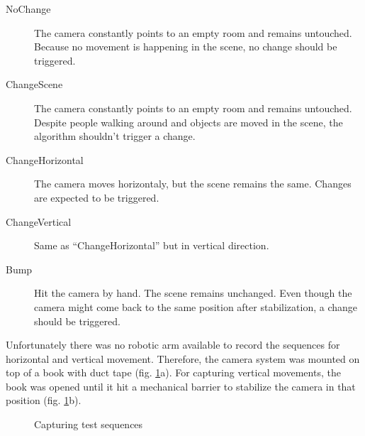 \begin{description}
	\item[NoChange] The camera constantly points to an empty room and remains untouched. Because no movement is happening in the scene, no change should be triggered.
	\item[ChangeScene] The camera constantly points to an empty room and remains untouched. Despite people walking around and objects are moved in the scene, the algorithm shouldn't trigger a change.
	\item[ChangeHorizontal] The camera moves horizontaly, but the scene remains the same. Changes are expected to be triggered.
	\item[ChangeVertical] Same as \enquote{ChangeHorizontal} but in vertical direction.
	\item[Bump] Hit the camera by hand. The scene remains unchanged. Even though the camera might come back to the same position after stabilization, a change should be triggered.
\end{description}

Unfortunately there was no robotic arm available to record the sequences for horizontal and vertical movement. Therefore, the camera system was mounted on top of a book with duct tape (fig. \ref{fig:capture}a). For capturing vertical movements, the book was opened until it hit a mechanical barrier to stabilize the camera in that position (fig. \ref{fig:capture}b).\newline

\begin{figure} [h]
	\caption{Capturing test sequences} 
	\label{fig:capture}
\end{figure} 
 
